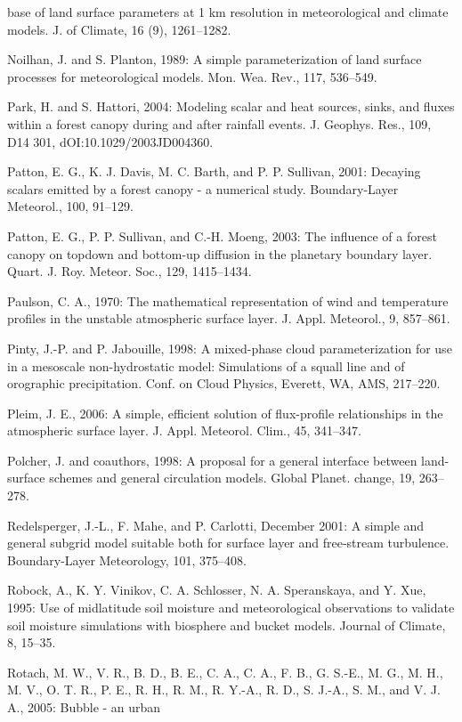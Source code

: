 \begin{description}
base of land surface parameters at 1 km resolution in meteorological and climate models. J.
of Climate, 16 (9), 1261–1282.
\item
Noilhan, J. and S. Planton, 1989: A simple parameterization of land surface processes for
meteorological models. Mon. Wea. Rev., 117, 536–549.
\item
Park, H. and S. Hattori, 2004: Modeling scalar and heat sources, sinks, and fluxes
within a forest canopy during and after rainfall events. J. Geophys. Res., 109, D14 301,
dOI:10.1029/2003JD004360.
\item
Patton, E. G., K. J. Davis, M. C. Barth, and P. P. Sullivan, 2001: Decaying scalars emitted by a
forest canopy - a numerical study. Boundary-Layer Meteorol., 100, 91–129.
\item
Patton, E. G., P. P. Sullivan, and C.-H. Moeng, 2003: The influence of a forest canopy on topdown
and bottom-up diffusion in the planetary boundary layer. Quart. J. Roy. Meteor. Soc.,
129, 1415–1434.
\item
Paulson, C. A., 1970: The mathematical representation of wind and temperature profiles in the
unstable atmospheric surface layer. J. Appl. Meteorol., 9, 857–861.
\item
Pinty, J.-P. and P. Jabouille, 1998: A mixed-phase cloud parameterization for use in a mesoscale
non-hydrostatic model: Simulations of a squall line and of orographic precipitation. Conf. on
Cloud Physics, Everett, WA, AMS, 217–220.
\item
Pleim, J. E., 2006: A simple, efficient solution of flux-profile relationships in the atmospheric
surface layer. J. Appl. Meteorol. Clim., 45, 341–347.
\item
Polcher, J. and coauthors, 1998: A proposal for a general interface between land-surface
schemes and general circulation models. Global Planet. change, 19, 263–278.
\item
Redelsperger, J.-L., F. Mahe, and P. Carlotti, December 2001: A simple and general subgrid
model suitable both for surface layer and free-stream turbulence. Boundary-Layer Meteorology,
101, 375–408.
\item
Robock, A., K. Y. Vinikov, C. A. Schlosser, N. A. Speranskaya, and Y. Xue, 1995: Use of midlatitude
soil moisture and meteorological observations to validate soil moisture simulations
with biosphere and bucket models. Journal of Climate, 8, 15–35.
\item
Rotach, M. W., V. R., B. D., B. E., C. A., C. A., F. B., G. S.-E., M. G., M. H., M. V., O. T. R.,
P. E., R. H., R. M., R. Y.-A., R. D., S. J.-A., S. M., and V. J. A., 2005: Bubble - an urban

\end{description}
